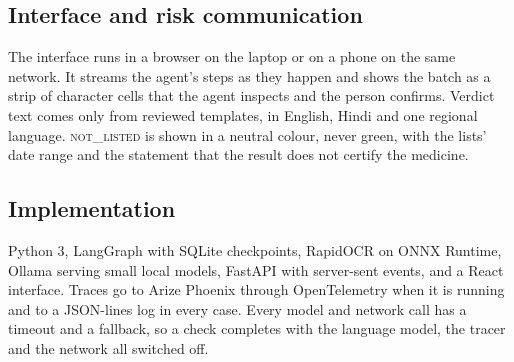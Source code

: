 \subsection{Interface and risk communication}
The interface runs in a browser on the laptop or on a phone on the same network. It streams the agent's steps as they happen and shows the batch as a strip of character cells that the agent inspects and the person confirms. Verdict text comes only from reviewed templates, in English, Hindi and one regional language. \textsc{not\_listed} is shown in a neutral colour, never green, with the lists' date range and the statement that the result does not certify the medicine.

\subsection{Implementation}
Python 3, LangGraph with SQLite checkpoints, RapidOCR on ONNX Runtime, Ollama serving small local models, FastAPI with server-sent events, and a React interface. Traces go to Arize Phoenix through OpenTelemetry when it is running and to a JSON-lines log in every case. Every model and network call has a timeout and a fallback, so a check completes with the language model, the tracer and the network all switched off. 
